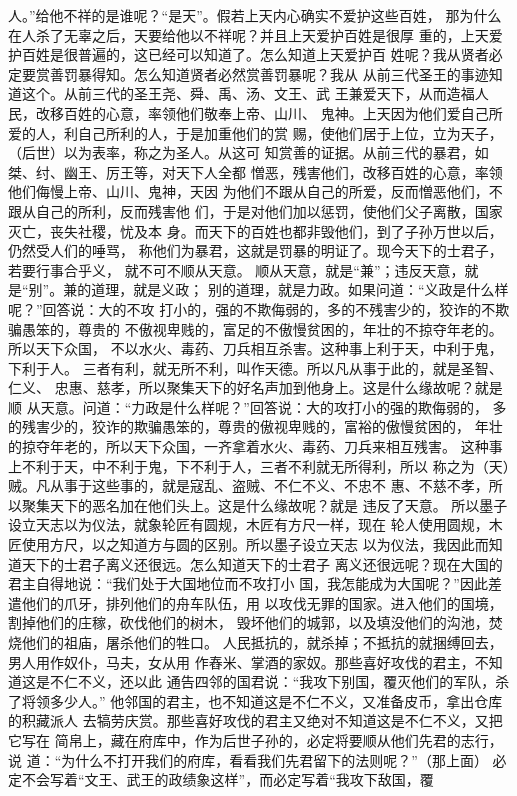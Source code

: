 \documentclass[12pt,UTF8]{ctexbook}
\begin{document}
人。”给他不祥的是谁呢？“是天”。假若上天内心确实不爱护这些百姓， 
那为什么在人杀了无辜之后，天要给他以不祥呢？并且上天爱护百姓是很厚 
重的，上天爱护百姓是很普遍的，这已经可以知道了。怎么知道上天爱护百 
姓呢？我从贤者必定要赏善罚暴得知。怎么知道贤者必然赏善罚暴呢？我从 
从前三代圣王的事迹知道这个。从前三代的圣王尧、舜、禹、汤、文王、武 
王兼爱天下，从而造福人民，改移百姓的心意，率领他们敬奉上帝、山川、 
鬼神。上天因为他们爱自己所爱的人，利自己所利的人，于是加重他们的赏 
赐，使他们居于上位，立为天子，（后世）以为表率，称之为圣人。从这可 
知赏善的证据。从前三代的暴君，如桀、纣、幽王、厉王等，对天下人全都 
憎恶，残害他们，改移百姓的心意，率领他们侮慢上帝、山川、鬼神，天因 
为他们不跟从自己的所爱，反而憎恶他们，不跟从自己的所利，反而残害他 
们，于是对他们加以惩罚，使他们父子离散，国家灭亡，丧失社稷，忧及本 
身。而天下的百姓也都非毁他们，到了子孙万世以后，仍然受人们的唾骂， 
称他们为暴君，这就是罚暴的明证了。现今天下的士君子，若要行事合乎义， 
就不可不顺从天意。 
顺从天意，就是“兼”；违反天意，就是“别”。兼的道理，就是义政； 
别的道理，就是力政。如果问道：“义政是什么样呢？”回答说：大的不攻 
打小的，强的不欺侮弱的，多的不残害少的，狡诈的不欺骗愚笨的，尊贵的 
不傲视卑贱的，富足的不傲慢贫困的，年壮的不掠夺年老的。所以天下众国， 
不以水火、毒药、刀兵相互杀害。这种事上利于天，中利于鬼，下利于人。 
三者有利，就无所不利，叫作天德。所以凡从事于此的，就是圣智、仁义、 
忠惠、慈孝，所以聚集天下的好名声加到他身上。这是什么缘故呢？就是顺 
从天意。问道：“力政是什么样呢？”回答说：大的攻打小的强的欺侮弱的， 
多的残害少的，狡诈的欺骗愚笨的，尊贵的傲视卑贱的，富裕的傲慢贫困的， 
年壮的掠夺年老的，所以天下众国，一齐拿着水火、毒药、刀兵来相互残害。 
这种事上不利于天，中不利于鬼，下不利于人，三者不利就无所得利，所以 
称之为（天）贼。凡从事于这些事的，就是寇乱、盗贼、不仁不义、不忠不 
惠、不慈不孝，所以聚集天下的恶名加在他们头上。这是什么缘故呢？就是 
违反了天意。 
所以墨子设立天志以为仪法，就象轮匠有圆规，木匠有方尺一样，现在 
轮人使用圆规，木匠使用方尺，以之知道方与圆的区别。所以墨子设立天志 
以为仪法，我因此而知道天下的士君子离义还很远。怎么知道天下的士君子 
离义还很远呢？现在大国的君主自得地说：“我们处于大国地位而不攻打小 
国，我怎能成为大国呢？”因此差遣他们的爪牙，排列他们的舟车队伍，用 
以攻伐无罪的国家。进入他们的国境，割掉他们的庄稼，砍伐他们的树木， 
毁坏他们的城郭，以及填没他们的沟池，焚烧他们的祖庙，屠杀他们的牲口。 
人民抵抗的，就杀掉；不抵抗的就捆缚回去，男人用作奴仆，马夫，女从用 
作舂米、掌酒的家奴。那些喜好攻伐的君主，不知道这是不仁不义，还以此 
通告四邻的国君说：“我攻下别国，覆灭他们的军队，杀了将领多少人。” 
他邻国的君主，也不知道这是不仁不义，又准备皮币，拿出仓库的积藏派人 
去犒劳庆赏。那些喜好攻伐的君主又绝对不知道这是不仁不义，又把它写在 
简帛上，藏在府库中，作为后世子孙的，必定将要顺从他们先君的志行，说 
道：“为什么不打开我们的府库，看看我们先君留下的法则呢？”（那上面） 
必定不会写着“文王、武王的政绩象这样”，而必定写着“我攻下敌国，覆 
\end{document}
